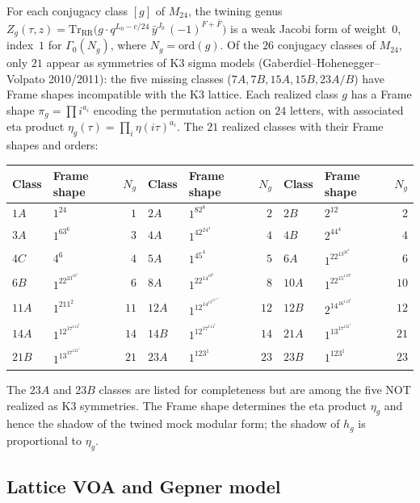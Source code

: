 \begin{remark}
\label{rem:twining-genera}
For each conjugacy class $[g]$ of $M_{24}$, the twining genus
$Z_g(\tau,z) = \mathrm{Tr}_{\mathrm{RR}}\bigl(g \cdot
q^{L_0 - c/24}\,\bar{y}^{J_0}\,(-1)^{F+\bar{F}}\bigr)$ is a
weak Jacobi form of weight~$0$, index~$1$ for
$\Gamma_0(N_g)$, where $N_g = \mathrm{ord}(g)$. Of the $26$
conjugacy classes of $M_{24}$, only $21$ appear as symmetries of
K3 sigma models (Gaberdiel--Hohenegger--Volpato 2010/2011): the
five missing classes ($7A, 7B, 15A, 15B, 23A/B$) have Frame
shapes incompatible with the K3 lattice. Each realized class $g$
has a Frame shape $\pi_g = \prod i^{a_i}$ encoding the permutation
action on $24$ letters, with associated eta product
$\eta_g(\tau) = \prod_i \eta(i\tau)^{a_i}$.
The $21$ realized classes with their Frame shapes and orders:
\begin{center}
\scriptsize
\renewcommand{\arraystretch}{1.15}
\begin{tabular}{llr|llr|llr}
Class & Frame shape & $N_g$
& Class & Frame shape & $N_g$
& Class & Frame shape & $N_g$ \\
\hline
$1A$ & $1^{24}$ & $1$
& $2A$ & $1^82^8$ & $2$
& $2B$ & $2^{12}$ & $2$ \\
$3A$ & $1^63^6$ & $3$
& $4A$ & $1^42^24^4$ & $4$
& $4B$ & $2^44^4$ & $4$ \\
$4C$ & $4^6$ & $4$
& $5A$ & $1^45^4$ & $5$
& $6A$ & $1^22^13^26^2$ & $6$ \\
$6B$ & $1^22^23^16^1$ & $6$
& $8A$ & $1^22^14^18^2$ & $8$
& $10A$ & $1^22^15^110^1$ & $10$ \\
$11A$ & $1^211^2$ & $11$
& $12A$ & $1^12^14^13^16^112^1$ & $12$
& $12B$ & $2^14^16^112^1$ & $12$ \\
$14A$ & $1^12^17^114^1$ & $14$
& $14B$ & $1^12^17^114^1$ & $14$
& $21A$ & $1^13^17^121^1$ & $21$ \\
$21B$ & $1^13^17^121^1$ & $21$
& $23A$ & $1^123^1$ & $23$
& $23B$ & $1^123^1$ & $23$
\end{tabular}
\end{center}
The $23A$ and $23B$ classes are listed for completeness but are
among the five NOT realized as K3 symmetries. The Frame shape
determines the eta product $\eta_g$ and hence the shadow of the
twined mock modular form; the shadow of $h_g$ is proportional
to $\eta_g$.
\end{remark}

\subsection{Lattice VOA and Gepner model}
\label{subsec:lattice-gepner}

